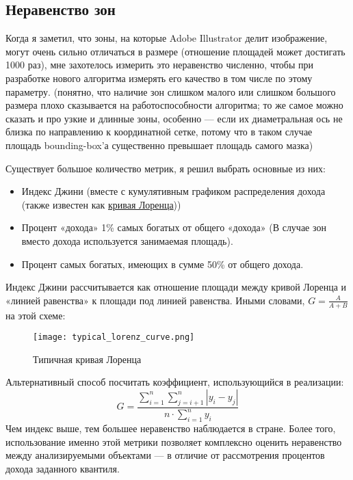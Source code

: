 \subsection{Неравенство зон}\label{subsec:inequality}
Когда я заметил, что зоны, на которые Adobe Illustrator делит изображение, могут очень сильно отличаться в размере (отношение площадей может достигать 1000 раз),
мне захотелось измерить это неравенство численно, чтобы при разработке нового алгоритма измерять его качество в том числе по этому параметру.
(понятно, что наличие зон слишком малого или слишком большого размера плохо сказывается на работоспособности алгоритма;
то же самое можно сказать и про узкие и длинные зоны,
особенно — если их диаметральная ось не близка по направлению к координатной сетке,
потому что в таком случае площадь bounding-box'а существенно превышает площадь самого мазка)

Существует большое количество метрик, я решил выбрать основные из них:
\begin{itemize}
    \item Индекс Джини (вместе с кумулятивным графиком распределения дохода (также известен как \href{https://en.wikipedia.org/wiki/Lorenz_curve}{кривая Лоренца}))
    \item Процент «дохода» 1\% самых богатых от общего «дохода» (В случае зон вместо дохода используется занимаемая площадь).
    \item Процент самых богатых, имеющих в сумме 50\% от общего дохода.
\end{itemize}

Индекс Джини рассчитывается как отношение площади между кривой Лоренца и «линией равенства» к площади под линией равенства.
Иными словами, $G = \frac{A}{A + B}$ на этой схеме:

\begin{figure}[h!]\label{fig:lorenz_curve}
    \centering
    \texttt{[image: typical\_lorenz\_curve.png]}
    \caption{Типичная кривая Лоренца}
\end{figure}
Альтернативный способ посчитать коэффициент, использующийся в реализации:
\begin{equation}
    G = \frac{\sum_{i=1}^{n}  \sum_{j=i+1}^{n}  \left| y_i - y_j \right|}{n \cdot \sum_{i=1}^{n} y_i}
\end{equation}
Чем индекс выше, тем большее неравенство наблюдается в стране.
Более того, использование именно этой метрики позволяет комплексно оценить неравенство между анализируемыми объектами —
в отличие от рассмотрения процентов дохода заданного квантиля.


